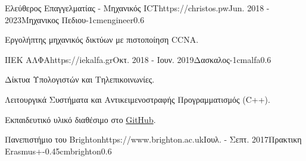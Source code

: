 \documentclass{mycv}
\begin{document}
	\vspace*{0.5cm}

	\begin{EntryDatedLogo}{Ελεύθερος Επαγγελματίας - Μηχανικός ICT}{https://christos.pw}{Jun. 2018 - 2023}{Μηχανικος Πεδιου}{-1cm}{engineer}{0.6}
		\begin{Itemize}
			\item Εργολήπτης μηχανικός δικτύων με πιστοποίηση CCNA.
		\end{Itemize}
	\end{EntryDatedLogo}

	\vspace*{0.5cm}	

	
	\vspace*{0.5cm}
	
	\begin{EntryDatedLogo}{ΙΙΕΚ ΑΛΦΑ}{https://iekalfa.gr}{Οκτ. 2018 - Ιουν. 2019}{Δασκαλος}{-1cm}{alfa}{0.6}
		\begin{Itemize}
			\item Δίκτυα Υπολογιστών και Τηλεπικοινωνίες.
			\item Λειτουργικά Συστήματα και Αντικειμενοστραφής Προγραμματισμός (C++).
			\item Εκπαιδευτικό υλικό διαθέσιμο στο \href{https://github.com/cdalamagkas/cs-lectures-gr}{GitHub}.
		\end{Itemize}
	\end{EntryDatedLogo}

	\vspace*{0.5cm}
		
	\begin{EntryDatedLogo}{Πανεπιστήμιο του Brighton}{https://www.brighton.ac.uk}{Ιουλ. - Σεπτ. 2017}{Πρακτικη Erasmus+}{-0.45cm}{brighton}{0.6}
	\end{EntryDatedLogo}
\end{document}
